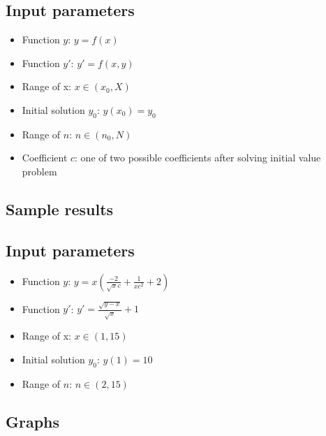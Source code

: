\documentclass[12pt,letterpaper]{article}
\begin{document}
\begin{center}
    \subsection*{Input parameters}
\end{center}

\begin{itemize}
    \item
         Function $y$: $y = f(x)$
    \item
         Function $y'$: $y' = f(x,y)$
    \item
         Range of x: $x \in (x_0, X)$
    \item
         Initial solution $y_0$: $y(x_0) = y_0$
    \item
         Range of $n$: $n \in (n_0, N)$
    \item
         Coefficient $c$: one of two possible coefficients after solving initial value problem
\end{itemize}

\begin{center}
    \section*{Sample results}
\end{center}

\begin{center}
    \subsection*{Input parameters}
\end{center}

\begin{itemize}
    \item
         Function $y$: $y = x(\frac{-2}{\sqrt{x}c} + \frac{1}{xc^2} + 2)$
    \item
         Function $y'$: $y' = \frac{\sqrt{y - x}}{\sqrt{x}} + 1$
    \item
         Range of x: $x \in (1, 15)$
    \item
         Initial solution $y_0$: $y(1) = 10$
    \item
         Range of $n$: $n \in (2, 15)$
\end{itemize}

\begin{center}
    \subsection*{Graphs}
\end{center}
\end{document}
